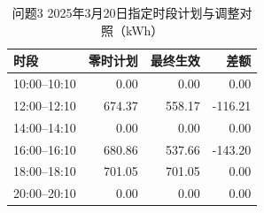 \begin{table}[H]
\centering\small
\caption{问题3 2025年3月20日指定时段计划与调整对照（kWh）}
\label{tab:q3_plan_adjust}
\begin{tabular}{lrrr}\toprule
时段 & 零时计划 & 最终生效 & 差额 \\\midrule
10:00--10:10 & 0.00 & 0.00 & 0.00 \\
12:00--12:10 & 674.37 & 558.17 & -116.21 \\
14:00--14:10 & 0.00 & 0.00 & 0.00 \\
16:00--16:10 & 680.86 & 537.66 & -143.20 \\
18:00--18:10 & 701.05 & 701.05 & 0.00 \\
20:00--20:10 & 0.00 & 0.00 & 0.00 \\
\bottomrule\end{tabular}
\end{table}
